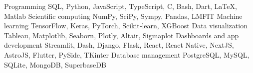 
\begin{cvskills}

\cvskill
{Programming}
{SQL, Python, JavaScript, TypeScript, C, Bash, Dart, LaTeX, Matlab}
\cvskill
{Scientific computing}
{NumPy, SciPy, Sympy, Pandas, LMFIT}
\cvskill
{Machine learning}
{TensorFlow, Keras, PyTorch, Scikit‑learn, XGBoost}
\cvskill
{Data visualization}
{Tableau, Matplotlib, Seaborn, Plotly, Altair, Sigmaplot}
\cvskill
{Dashboards and app development}
{Streamlit, Dash, Django, Flask, React, React Native, NextJS, AstroJS, Flutter, PySide, TKinter}
\cvskill
{Database management}
{PostgreSQL, MySQL, SQLite, MongoDB, SuperbaseDB}
\end{cvskills}